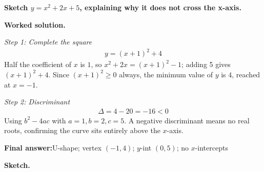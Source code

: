 \documentclass[11pt]{article}
\newcommand{\question}[1]{\par\medskip\noindent\textbf{#1}\par}
\begin{document}
\question{Sketch \( y = x^2 + 2x + 5 \), explaining why it does not cross the x-axis.}

\textbf{Worked solution.}

\textit{Step 1: Complete the square}
\[\begin{gathered}
y = (x+1)^2 + 4
\end{gathered}\]
Half the coefficient of \( x \) is \( 1 \), so \( x^2 + 2x = (x+1)^2 - 1 \); adding 5 gives \( (x+1)^2 + 4 \). Since \( (x+1)^2 \geq 0 \) always, the minimum value of \( y \) is \( 4 \), reached at \( x = -1 \).

\textit{Step 2: Discriminant}
\[\begin{gathered}
\Delta = 4 - 20 = -16 < 0
\end{gathered}\]
Using \( b^2 - 4ac \) with \( a=1, b=2, c=5 \). A negative discriminant means no real roots, confirming the curve sits entirely above the \( x \)-axis.

\begin{answerbox}
\textbf{Final answer:}\quad U-shape; vertex \(\displaystyle (-1, 4)\); \(\displaystyle y\)-int \(\displaystyle (0,5)\); no \(\displaystyle x\)-intercepts
\end{answerbox}
\textbf{Sketch.}
\end{document}
